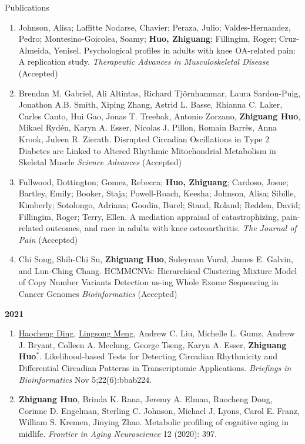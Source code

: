 \documentclass{resume} %
\begin{document}
\begin{rSection}{Publications}
\begin{enumerate}[noitemsep,topsep=0pt, resume]
\item
Johnson, Alisa; Laffitte Nodarse, Chavier; Peraza, Julio; Valdes-Hernandez, Pedro; Montesino-Goicolea, Soamy; {\bf Huo, Zhiguang}; Fillingim, Roger; Cruz-Almeida, Yenisel. 
Psychological profiles in adults with knee OA-related pain: A replication study.
\emph{Therapeutic Advances in Musculoskeletal Disease} (Accepted)

\item  
Brendan M. Gabriel, Ali Altintas, Richard Tjörnhammar, Laura Sardon-Puig, Jonathon A.B. Smith, Xiping Zhang, Astrid L. Basse, Rhianna C. Laker, Carles Canto, Hui Gao, Jonas T. Treebak, Antonio Zorzano, {\bf Zhiguang Huo}, Mikael Rydén, Karyn A. Esser, Nicolas J. Pillon, Romain Barrès, Anna Krook, Juleen R. Zierath. 
Disrupted Circadian Oscillations in Type 2 Diabetes are Linked to Altered Rhythmic Mitochondrial Metabolism in Skeletal Muscle
\emph{Science Advances} (Accepted)


\item  
Fullwood, Dottington; Gomez, Rebecca; {\bf Huo, Zhiguang}; Cardoso, Josue; Bartley, Emily; Booker, Staja; Powell-Roach, Keesha; Johnson, Alisa; Sibille, Kimberly; Sotolongo, Adriana; Goodin, Burel; Staud, Roland; Redden, David; Fillingim, Roger; Terry, Ellen. 
A mediation appraisal of catastrophizing, pain-related outcomes, and race in adults with knee osteoarthritis. 
\emph{The Journal of Pain} (Accepted)

\item  
Chi Song, Shih-Chi Su, {\bf Zhiguang Huo}, Suleyman Vural, James E. Galvin, and Lun-Ching Chang. 
HCMMCNVs: Hierarchical Clustering Mixture Model of Copy Number Variants Detection us-ing Whole Exome Sequencing in Cancer Genomes
\emph{Bioinformatics} (Accepted)



\end{enumerate}


\textbf{2021}
\begin{enumerate}[noitemsep,topsep=0pt, resume]

\item
\underline{Haocheng Ding}, \underline{Lingsong Meng}, Andrew C. Liu, Michelle L. Gumz, Andrew J. Bryant, Colleen A. Mcclung, George Tseng, Karyn A. Esser, {\bf Zhiguang Huo}$^*$.
Likelihood-based Tests for Detecting Circadian Rhythmicity and Differential Circadian Patterns in Transcriptomic Applications. 
\emph{Briefings in Bioinformatics} Nov 5;22(6):bbab224.

\item  {\bf Zhiguang Huo}, Brinda K. Rana, Jeremy A. Elman, Ruocheng Dong, Corinne D. Engelman, Sterling C. Johnson, Michael J. Lyons, Carol E. Franz, William S. Kremen, Jinying Zhao.
Metabolic profiling of cognitive aging in midlife.
\emph{Frontier in Aging Neuroscience} 12 (2020): 397.



\end{enumerate}
\end{rSection}
\end{document}
